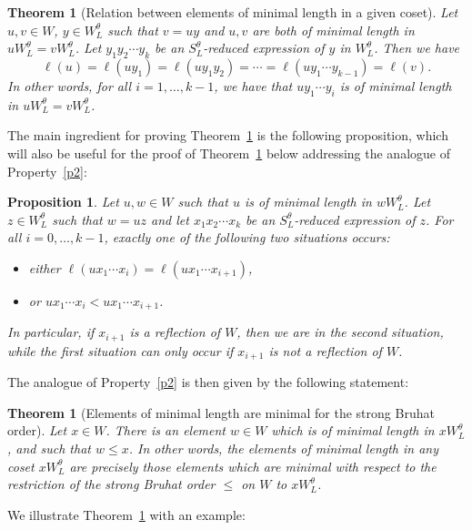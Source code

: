 \documentclass[11pt]{article}
\newtheorem{theorem}[theo]{Theorem}
\newtheorem{prop}[theo]{Proposition}
\theoremstyle{definition}
\numberwithin{equation}{section}
\begin{document}
\begin{theorem}[Relation between elements of minimal length in a given coset]\label{thm_min}
Let $u,v\in W$, $y\in W_L^\theta$ such that $v=uy$ and $u,v$ are both of minimal length in $u W_L^\theta= v W_L^\theta$. Let $y_1 y_2 \cdots y_k$ be an $S_L^\theta$-reduced expression of $y$ in $W_L^\theta$. Then we have $$\ell(u)=\ell(uy_1)=\ell(uy_1 y_2)=\cdots =\ell(u y_1 \cdots y_{k-1})=\ell(v).$$
In other words, for all $i=1, \dots, k-1$, we have that $u y_1 \cdots y_i$ is of minimal length in $uW_L^\theta=v W_L^\theta$.  
\end{theorem}    



The main ingredient for proving Theorem~\ref{thm_min} is the following proposition, which will also be useful for the proof of Theorem~\ref{main_mm} below addressing the analogue of Property~\ref{p2}: 

\begin{prop}\label{prop_esc}
Let $u, w\in W$ such that $u$ is of minimal length in $w W_L^\theta$. Let $z\in W_L^\theta$ such that $w=uz$ and let $x_1 x_2 \cdots x_k$ be an $S_L^\theta$-reduced expression of $z$. For all $i=0, \dots, k-1$, exactly one of the following two situations occurs:
\begin{itemize}
	\item either $\ell(u x_1 \cdots x_i)=\ell(u x_1 \cdots x_{i+1})$, 
	\item or $u x_1 \cdots x_i < u x_1 \cdots x_{i+1}$.
\end{itemize}
In particular, if $x_{i+1}$ is a reflection of $W$, then we are in the second situation, while the first situation can only occur if $x_{i+1}$ is not a reflection of $W$. 
\end{prop}

The analogue of Property~\ref{p2} is then given by the following statement:

\begin{theorem}[Elements of minimal length are minimal for the strong Bruhat order]\label{main_mm}
Let $x\in W$. There is an element $w\in W$ which is of minimal length in $x W_L^\theta$, and such that $w \leq x$. In other words, the elements of minimal length in any coset $x W_L^\theta$ are precisely those elements which are minimal with respect to the restriction of the strong Bruhat order $\leq$ on $W$ to $x W_L^\theta$. 
\end{theorem}

We illustrate Theorem~\ref{thm_min} with an example:
\end{document}
